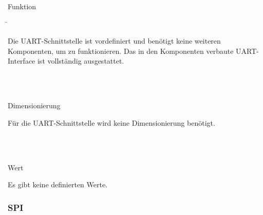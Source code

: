 \begin{tabbing}
\parbox[t]{.25\textwidth}{

Funktion

} \=\parbox[t]{.75\textwidth}{

Die UART-Schnittstelle ist vordefiniert und benötigt keine weiteren Komponenten, um zu funktionieren. Das in den Komponenten verbaute UART-Interface ist vollständig ausgestattet.

}\\
\\
\parbox[t]{.25\textwidth}{

Dimensionierung

} \>\parbox[t]{.75\textwidth}{

Für die UART-Schnittstelle wird keine Dimensionierung benötigt.

}\\
\\
\parbox[t]{.25\textwidth}{

Wert

} \>\parbox[t]{.75\textwidth}{

Es gibt keine definierten Werte.\\




}
\end{tabbing}

\subsubsection{SPI}\label{subsubsec:SPI_Mikrocontroller}

